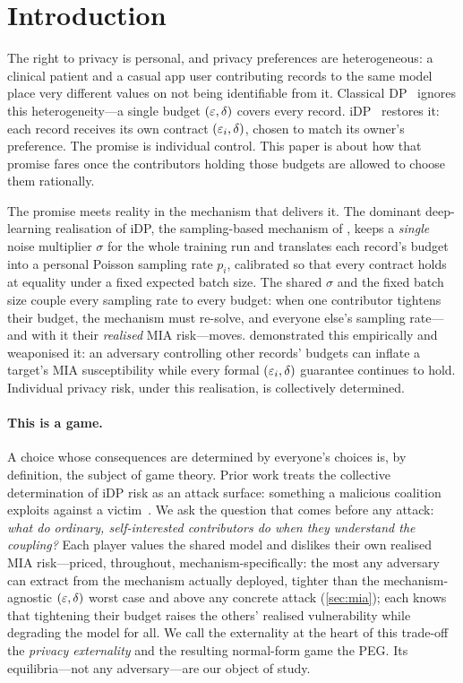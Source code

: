 \section{Introduction}
\label{sec:intro}

The right to privacy is personal, and privacy preferences are
heterogeneous: a clinical patient and a casual app user contributing
records to the same model place very different values on not being
identifiable from it. Classical \ac{DP}~\cite{dwork2006calibrating} ignores this heterogeneity---a single
budget $(\varepsilon,\delta)$ covers every record. \ac{iDP}~\cite{jorgensen2015conservative,
boenisch2023have, feldman2021individual} restores it: each record
receives its own contract $(\varepsilon_i, \delta)$, chosen to match its
owner's preference. The promise is individual control. This paper is
about how that promise fares once the contributors holding those
budgets are allowed to choose them rationally.

The promise meets reality in the mechanism that delivers it. The
dominant deep-learning realisation of \ac{iDP}, the sampling-based
mechanism of \citet{boenisch2023have}, keeps a \emph{single} noise
multiplier $\sigma$ for the whole training run and translates each
record's budget into a personal Poisson sampling rate $p_i$,
calibrated so that every contract holds at equality under a fixed
expected batch size. The shared $\sigma$ and the fixed batch size
couple every sampling rate to every budget: when one contributor
tightens their budget, the mechanism must re-solve, and everyone else's
sampling rate---and with it their \emph{realised} \ac{MIA} risk---moves. \citet{kaiser2026your} demonstrated this
empirically and weaponised it: an adversary controlling other records'
budgets can inflate a target's \ac{MIA} susceptibility while every formal
$(\varepsilon_i,\delta)$ guarantee continues to hold. Individual privacy
risk, under this realisation, is collectively determined.

\paragraph{This is a game.} A choice whose consequences are determined
by everyone's choices is, by definition, the subject of game theory.
Prior work treats the collective determination of \ac{iDP} risk as an
attack surface: something a malicious coalition exploits against a
victim~\cite{kaiser2026your}. We ask the question that comes before
any attack: \emph{what do ordinary, self-interested contributors do
when they understand the coupling?} Each player values the shared
model and dislikes their own realised \ac{MIA} risk---priced, throughout,
mechanism-specifically: the most any adversary can extract from the
mechanism actually deployed, tighter than the mechanism-agnostic
$(\varepsilon,\delta)$ worst case and above any concrete
attack (\cref{sec:mia}); each knows that
tightening their budget raises the others' realised vulnerability while
degrading the model for all. We call the externality at the heart of this trade-off
the \emph{privacy externality} and the resulting normal-form game the
\ac{PEG}. Its equilibria---not any
adversary---are our object of study.


